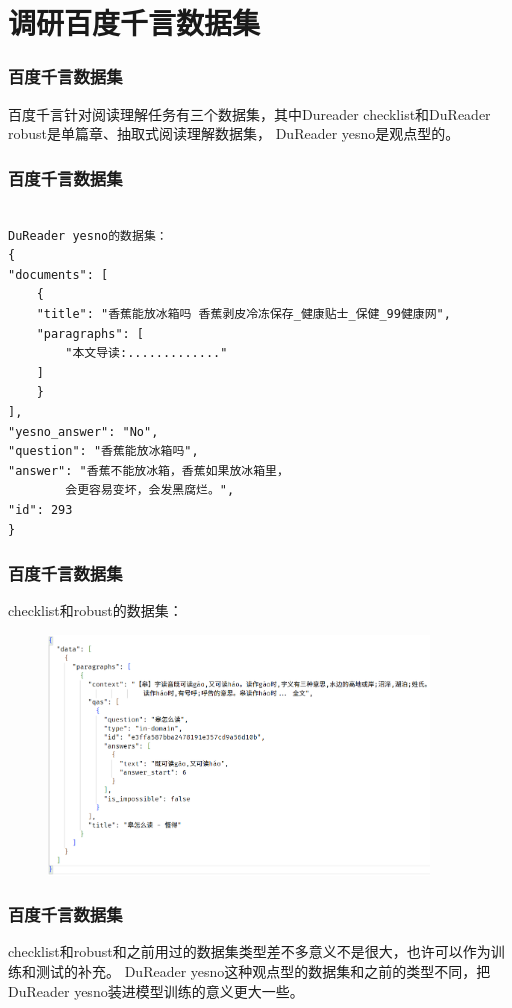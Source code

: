 \documentclass{beamer}
\begin{document}
\section{调研百度千言数据集}
\begin{frame}
    \frametitle{百度千言数据集}
    百度千言针对阅读理解任务有三个数据集，其中Dureader checklist和DuReader robust是单篇章、抽取式阅读理解数据集，
    DuReader yesno是观点型的。


\end{frame}

\begin{frame}[fragile]
    \frametitle{百度千言数据集}
    \begin{lstlisting}[]

DuReader yesno的数据集：
{
"documents": [
    {
    "title": "香蕉能放冰箱吗 香蕉剥皮冷冻保存_健康贴士_保健_99健康网",
    "paragraphs": [
        "本文导读:............."
    ]
    }
],
"yesno_answer": "No",
"question": "香蕉能放冰箱吗",
"answer": "香蕉不能放冰箱，香蕉如果放冰箱里，
        会更容易变坏，会发黑腐烂。",
"id": 293
}
    \end{lstlisting}

\end{frame}

\begin{frame}[fragile]
    \frametitle{百度千言数据集}

    checklist和robust的数据集：

    \begin{figure}[tb]
        \centering
        \includegraphics[width=0.9\textwidth]{fig/data.png}
    \end{figure}

\end{frame}

\begin{frame}
    \frametitle{百度千言数据集}

    checklist和robust和之前用过的数据集类型差不多意义不是很大，也许可以作为训练和测试的补充。
    DuReader yesno这种观点型的数据集和之前的类型不同，把DuReader yesno装进模型训练的意义更大一些。

\end{frame}
\end{document}
